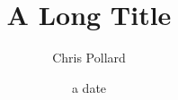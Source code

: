 \documentclass{beamer}
\title[SHORT TITLE]{A Long Title}
\author{Chris Pollard}
\institute[Glasgow]{University of Glasgow}
\date{a date}
\begin{document}
\begin{frame}
\titlepage
\end{frame}



\appendix



\appendix



\end{document}
